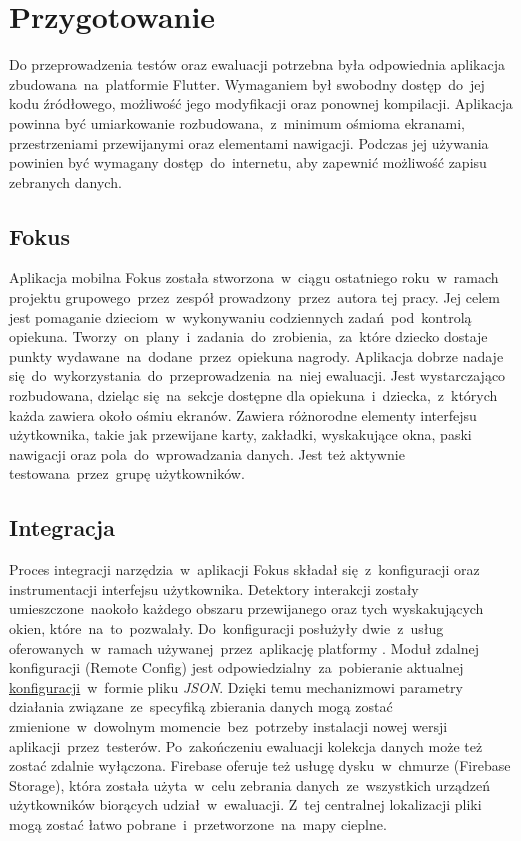 \section{Przygotowanie}
Do przeprowadzenia testów oraz ewaluacji potrzebna była odpowiednia aplikacja zbudowana~na~platformie Flutter. Wymaganiem był swobodny dostęp~do~jej kodu źródłowego, możliwość jego modyfikacji oraz ponownej kompilacji. Aplikacja powinna być umiarkowanie rozbudowana,~z~minimum ośmioma ekranami, przestrzeniami przewijanymi oraz elementami nawigacji. Podczas jej używania powinien być wymagany dostęp~do~internetu, aby zapewnić możliwość zapisu zebranych danych. 

\subsection{Fokus}
Aplikacja mobilna Fokus została stworzona~w~ciągu ostatniego roku~w~ramach projektu grupowego~przez~zespół prowadzony~przez~autora tej pracy. Jej celem jest pomaganie dzieciom~w~wykonywaniu codziennych zadań~pod~kontrolą opiekuna. Tworzy~on~plany~i~zadania~do~zrobienia,~za~które dziecko dostaje punkty wydawane~na~dodane~przez~opiekuna nagrody. Aplikacja dobrze nadaje się~do~wykorzystania~do~przeprowadzenia~na~niej ewaluacji. Jest wystarczająco rozbudowana, dzieląc się~na~sekcje dostępne dla opiekuna~i~dziecka,~z~których każda zawiera około ośmiu ekranów. Zawiera różnorodne elementy interfejsu użytkownika, takie jak przewijane karty, zakładki, wyskakujące okna, paski nawigacji oraz pola~do~wprowadzania danych. Jest też aktywnie testowana~przez~grupę użytkowników.

\subsection{Integracja}
Proces integracji narzędzia~w~aplikacji Fokus składał się~z~konfiguracji oraz instrumentacji interfejsu użytkownika. Detektory interakcji zostały umieszczone~naokoło każdego obszaru przewijanego oraz tych wyskakujących okien, które~na~to~pozwalały. Do~konfiguracji posłużyły dwie~z~usług oferowanych~w~ramach używanej~przez~aplikację platformy . Moduł zdalnej konfiguracji (Remote Config) jest odpowiedzialny~za~pobieranie aktualnej \hyperref[sec:rs_config]{konfiguracji}~w~formie pliku {\it JSON}. Dzięki temu mechanizmowi parametry działania związane~ze~specyfiką zbierania danych mogą zostać zmienione~w~dowolnym momencie~bez~potrzeby instalacji nowej wersji aplikacji~przez~testerów. Po~zakończeniu ewaluacji kolekcja danych może też zostać zdalnie wyłączona. Firebase oferuje też usługę dysku~w~chmurze (Firebase Storage), która została użyta~w~celu zebrania danych~ze~wszystkich urządzeń użytkowników biorących udział~w~ewaluacji. Z~tej centralnej lokalizacji pliki mogą zostać łatwo pobrane~i~przetworzone~na~mapy cieplne.
